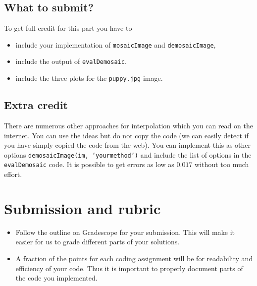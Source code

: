\documentclass[10pt,letterpaper]{article}
\newcommand{\cmd}[1] {{\color{blue}\texttt{#1}}}
\begin{document}
\subsection{What to submit?}
To get full credit for this part you have to 
\begin{itemize}
\item include your implementation of \cmd{mosaicImage} and \cmd{demosaicImage},
\item include the output of \cmd{evalDemosaic}.
\item include the three plots for the \cmd{puppy.jpg} image.
\end{itemize}

\subsection{Extra credit}
There are numerous other approaches for interpolation which you can read on the internet. You can use the ideas but do not copy the code (we can easily detect if you have simply copied the code from the web). You can implement this as other options \cmd{demosaicImage(im, `yourmethod')} and include the list of options in the \cmd{evalDemosaic} code. It is possible to get errors as low as $0.017$ without too much effort.

\section{Submission and rubric}
\begin{itemize}
\item Follow the outline on Gradescope for your submission. This will make it easier for us to grade different parts of your solutions.
\item A fraction of the points for each coding assignment will be for readability and efficiency of your code. Thus it is important to properly document parts of the code you implemented.
\end{itemize}
\end{document}

